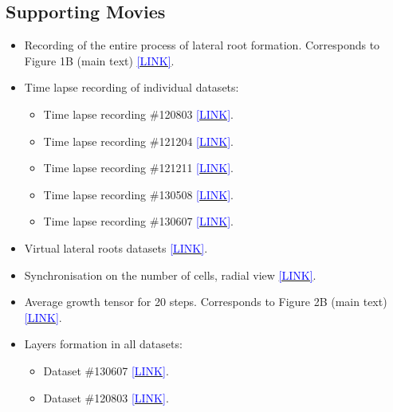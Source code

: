 \documentclass[11pt,a4paper, final]{article}
\newenvironment{Itemize}{
 \begin{itemize}[leftmargin=0.5cm]{
}}{\end{itemize}}
\begin{document}
%


\clearpage
\subsection{Supporting Movies}
\label{sec:suppmovies}

\begin{Itemize}
  \item Recording of the entire process of lateral root formation. Corresponds to Figure 1B (main text) \href{http://youtu.be/navcxqh7KCo}{\textcolor{blue}{[LINK]}}.
  \item Time lapse recording of individual datasets:
  \begin{Itemize}
  	\item Time lapse recording \#120803 \href{http://youtu.be/hvoDhoWLdSI}{\textcolor{blue}{[LINK]}}.
    \item Time lapse recording \#121204 \href{http://youtu.be/bXf-gO8T0aQ}{\textcolor{blue}{[LINK]}}.
    \item Time lapse recording \#121211 \href{http://youtu.be/ru7-g3KWV9E}{\textcolor{blue}{[LINK]}}.
    \item Time lapse recording \#130508 \href{http://youtu.be/GApOwRMWmUU}{\textcolor{blue}{[LINK]}}.
    \item Time lapse recording \#130607 \href{http://youtu.be/cFemfGbI5yA}{\textcolor{blue}{[LINK]}}.
  \end{Itemize}
  \item Virtual lateral roots datasets \href{http://youtu.be/EXIp3H0y5UI}{\textcolor{blue}{[LINK]}}.
  \item Synchronisation on the number of cells, radial view \href{http://youtu.be/YZFkpcnyjiY}{\textcolor{blue}{[LINK]}}.
  \item Average growth tensor for 20 steps. Corresponds to Figure 2B (main text) \href{https://youtu.be/t2hpMR6VFIg}{\textcolor{blue}{[LINK]}}.
  \item Layers formation in all datasets:
  \begin{Itemize}
    \item Dataset \#130607 \href{http://youtu.be/cdY3t1iVRF8}{\textcolor{blue}{[LINK]}}.
    \item Dataset \#120803 \href{http://youtu.be/yXki6QpltZo}{\textcolor{blue}{[LINK]}}.

\end{Itemize}
\end{Itemize}
\end{document}
